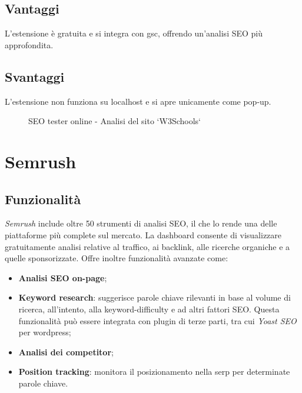 \subsection{Vantaggi}
\par L'estensione è gratuita e si integra con \gls{gsc}, offrendo un'analisi SEO più approfondita.

\subsection{Svantaggi}
\par L'estensione non funziona su \gls{localhost} e si apre unicamente come pop-up.

\begin{figure}[H]
    \centering 
    \caption{SEO tester online - Analisi del sito `W3Schools`}
\end{figure}

\section{Semrush}

\subsection{Funzionalità}
\par \textit{Semrush} include oltre 50 strumenti di analisi SEO, il che lo rende una delle piattaforme più complete sul mercato. La dashboard consente di visualizzare gratuitamente analisi relative al traffico, ai \gls{backlink}, alle ricerche \gls{organiche} e a quelle \gls{sponsorizzate}. Offre inoltre funzionalità avanzate come:
\begin{itemize}
    \item \textbf{Analisi SEO \gls{on-page}};
    \item \textbf{Keyword research}: suggerisce parole chiave rilevanti in base al volume di ricerca, all'intento, alla \gls{keyword-difficulty} e ad altri fattori SEO. Questa funzionalità può essere integrata con plugin di terze parti, tra cui \textit{Yoast SEO} per \gls{wordpress};
    \item \textbf{Analisi dei competitor};
    \item \textbf{Position tracking}: monitora il posizionamento nella \gls{serp} per determinate parole chiave.
\end{itemize}

